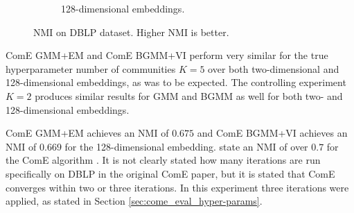 \documentclass[conference]{IEEEtran}
\begin{document}
\begin{figure}[h]
\begin{subfigure}{.5\textwidth}
        \caption{128-dimensional embeddings.}
        \label{fig:dblp_nmi_d128}
    \end{subfigure}

    \caption{NMI on DBLP dataset. Higher NMI is better.}
    \label{fig:dblp_nmi}
\end{figure}


ComE GMM+EM and ComE BGMM+VI perform very similar for the true hyperparameter number of communities $K=5$ over both two-dimensional and 128-dimensional embeddings, as was to be expected. The controlling experiment $K=2$ produces similar results for GMM and BGMM as well for both two- and 128-dimensional embeddings.

ComE GMM+EM achieves an NMI of $0.675$ and ComE BGMM+VI achieves an NMI of $0.669$ for the 128-dimensional embedding.
\citeauthor{ComE} state an NMI of over $0.7$ for the ComE algorithm \cite{ComE}. It is not clearly stated how many iterations are run specifically on DBLP in the original ComE paper, but it is stated that ComE converges within two or three iterations.\cite{ComE} In this experiment three iterations were applied, as stated in Section \ref{sec:come_eval_hyper-params}.
\end{document}
